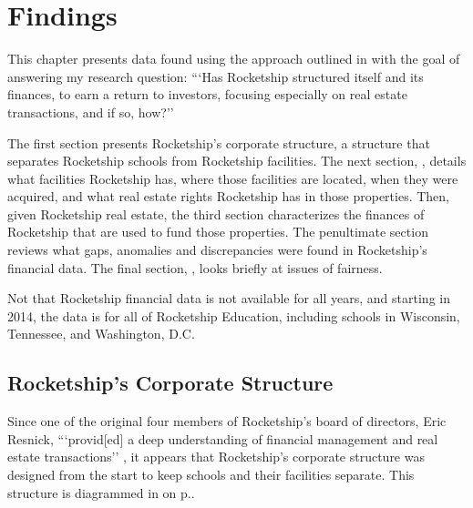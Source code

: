 
\chapter{Findings}\label{ch:findings}\noindent
This chapter presents data found using the approach outlined in  with the goal of answering my research question: ```Has Rocketship structured itself and its finances, to earn a return to investors, focusing especially on real estate transactions, and if so, how?''

The first section presents Rocketship's corporate structure, a structure that separates Rocketship schools from Rocketship facilities. The next section, , details what facilities Rocketship has, where those facilities are located, when they were acquired, and what real estate rights Rocketship has in those properties. Then, given Rocketship real estate, the third section characterizes the finances of Rocketship that are used to fund those properties. The penultimate section reviews what gaps, anomalies and discrepancies were found in Rocketship's financial data. The final section, , looks briefly at issues of fairness.

Not that Rocketship financial data is not available for all years, and starting in 2014, the data is for all of Rocketship Education, including schools in Wisconsin, Tennessee, and Washington, D.C.

\section{Rocketship's Corporate Structure}\indent%
\label{sec:RSED-corporate-structure}

Since one of the original four members of Rocketship's board of directors, Eric Resnick, ```provid[ed] a deep
understanding of financial management and real estate transactions'' \parencite{Danner2006}%
, it appears that Rocketship's corporate structure was designed from the start to keep schools and their facilities separate. This structure is diagrammed in  on p.\pageref{fig:corporate-structure}.

